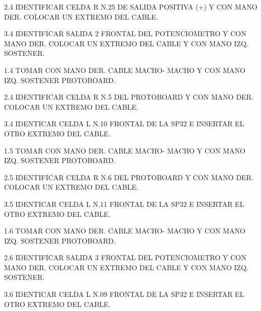 2.4 IDENTIFICAR CELDA R N.25 DE SALIDA POSITIVA (+)  Y CON MANO DER. COLOCAR UN EXTREMO DEL CABLE.






 3.4 IDENTIFICAR SALIDA 2 FRONTAL DEL POTENCIOMETRO Y CON MANO DER. COLOCAR UN EXTREMO DEL CABLE Y CON MANO IZQ. SOSTENER.











1.4  TOMAR CON MANO DER. CABLE MACHO- MACHO Y CON MANO IZQ. SOSTENER PROTOBOARD.






2.4 IDENTIFICAR CELDA R N.5 DEL PROTOBOARD Y CON MANO DER. COLOCAR UN EXTREMO DEL CABLE.






 3.4 IDENTICAR CELDA L N.10 FRONTAL DE LA SP32 E INSERTAR EL OTRO EXTREMO DEL CABLE. 










1.5  TOMAR CON MANO DER. CABLE MACHO- MACHO Y CON MANO IZQ. SOSTENER PROTOBOARD.






2.5 IDENTIFICAR CELDA R N.6 DEL PROTOBOARD Y CON MANO DER. COLOCAR UN EXTREMO DEL CABLE.






 3.5 IDENTICAR CELDA L N.11 FRONTAL DE LA SP32 E INSERTAR EL OTRO EXTREMO DEL CABLE. 












1.6  TOMAR CON MANO DER. CABLE MACHO- MACHO Y CON MANO IZQ. SOSTENER PROTOBOARD.






2.6  IDENTIFICAR SALIDA 3 FRONTAL DEL POTENCIOMETRO Y CON MANO DER. COLOCAR UN EXTREMO DEL CABLE Y CON MANO IZQ. SOSTENER.






 3.6 IDENTICAR CELDA L N.09 FRONTAL DE LA SP32 E INSERTAR EL OTRO EXTREMO DEL CABLE. 











